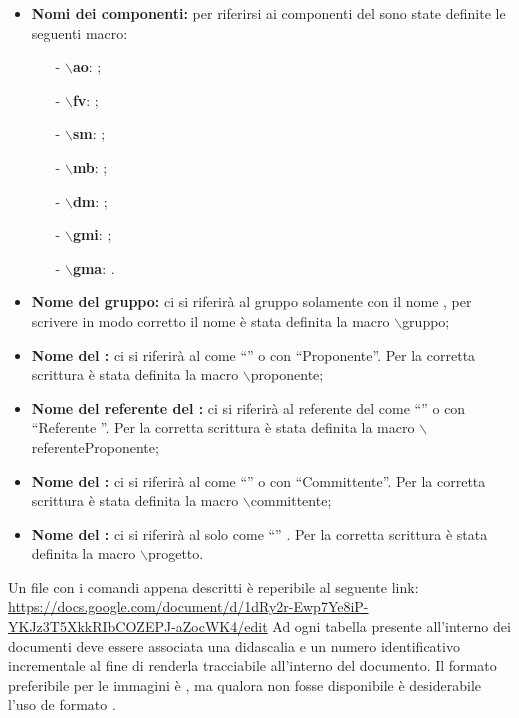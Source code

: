 \begin{itemize}
\item \textbf{Nomi dei componenti:} per riferirsi ai componenti del  sono state definite le seguenti macro:
\begin{itemize}
\item[-] \textbf{$\backslash$ao}: \ao;
\item[-] \textbf{$\backslash$fv}: \fv;
\item[-] \textbf{$\backslash$sm}: \sm;
\item[-] \textbf{$\backslash$mb}: \mb;
\item[-] \textbf{$\backslash$dm}: \dm;
\item[-] \textbf{$\backslash$gmi}: \gmi;
\item[-] \textbf{$\backslash$gma}: \gma.
\end{itemize}
\item \textbf{Nome del gruppo:} ci si riferirà al gruppo solamente con il nome \gruppo , per scrivere in modo corretto il nome è stata definita la macro $\backslash$gruppo;
\item \textbf{Nome del :} ci si riferirà al  come ``\proponente'' o con ``Proponente''. Per la corretta scrittura è stata definita la macro $\backslash$proponente;
\item \textbf{Nome del referente del :} ci si riferirà al referente del  come ``'' o con ``Referente \proponente''. Per la corretta scrittura è stata definita la macro $\backslash$referenteProponente;
\item \textbf{Nome del :} ci si riferirà al  come ``\committente'' o con ``Committente''. Per la corretta scrittura è stata definita la macro $\backslash$committente;
\item \textbf{Nome del :} ci si riferirà al  solo come ``\progetto'' . Per la corretta scrittura è stata definita la macro $\backslash$progetto.
\end{itemize}
Un file con i comandi appena descritti è reperibile al seguente link: \\
\url{https://docs.google.com/document/d/1dRy2r-Ewp7Ye8iP-YKJz3T5XkkRIbCOZEPJ-aZocWK4/edit}
Ad ogni tabella presente all'interno dei documenti deve essere associata una didascalia e un numero identificativo incrementale al fine di renderla tracciabile all'interno del documento.
Il formato preferibile per le immagini è , ma qualora non fosse disponibile è desiderabile l'uso de formato .
